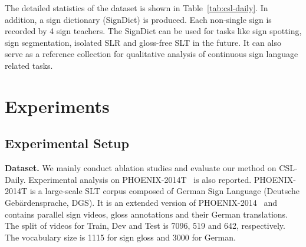 \documentclass[final]{cvpr}
\begin{document}
The detailed statistics of the dataset is shown in Table~\ref{tab:csl-daily}. 
In addition, a sign dictionary (SignDict) is produced. 
Each non-single sign is recorded by 4 sign teachers.  
The SignDict can be used for tasks like sign spotting, sign segmentation, isolated SLR and gloss-free SLT in the future. 
It can also serve as a reference collection for qualitative analysis of continuous sign language related tasks. 


\section{Experiments} \label{sec:experiment}

\subsection{Experimental Setup}

\begin{table}[tp]
   \centering
   \footnotesize
   \caption{Statistics of the training data. (OOV-\%: the ratio of words or characters which are out of the parallel data vocabulary.)} \label{tab:trainingdata}
\vspace{-8pt}
\end{table}

\textbf{Dataset.} 
We mainly conduct ablation studies and evaluate our method on CSL-Daily. 
Experimental analysis on PHOENIX-2014T~\cite{slt-nslt-cihan18} is also reported. 
PHOENIX-2014T is a large-scale SLT corpus composed of German Sign Language (Deutsche Gebärdensprache, DGS). 
It is an extended version of PHOENIX-2014~\cite{phoenix2014} and contains parallel sign videos, gloss annotations and their German translations. 
The split of videos for Train, Dev and Test is 7096, 519 and 642, respectively. 
The vocabulary size is 1115 for sign gloss and 3000 for German. 
\end{document}
